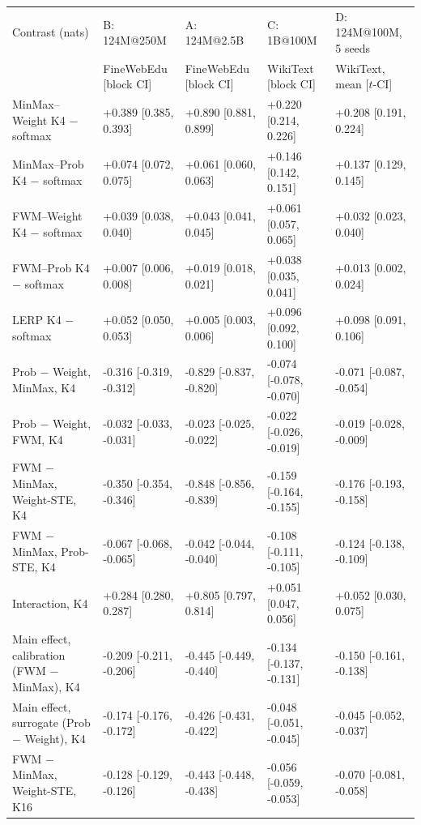 \setlength{\tabcolsep}{3pt}\begin{tabular}{lllll}
\toprule
Contrast (nats) & B: 124M@250M & A: 124M@2.5B & C: 1B@100M & D: 124M@100M, 5 seeds \\
& FineWebEdu [block CI] & FineWebEdu [block CI] & WikiText [block CI] & WikiText, mean [$t$-CI] \\
\midrule
MinMax--Weight K4 $-$ softmax & +0.389 [0.385, 0.393] & +0.890 [0.881, 0.899] & +0.220 [0.214, 0.226] & +0.208 [0.191, 0.224] \\
MinMax--Prob K4 $-$ softmax & +0.074 [0.072, 0.075] & +0.061 [0.060, 0.063] & +0.146 [0.142, 0.151] & +0.137 [0.129, 0.145] \\
FWM--Weight K4 $-$ softmax & +0.039 [0.038, 0.040] & +0.043 [0.041, 0.045] & +0.061 [0.057, 0.065] & +0.032 [0.023, 0.040] \\
FWM--Prob K4 $-$ softmax & +0.007 [0.006, 0.008] & +0.019 [0.018, 0.021] & +0.038 [0.035, 0.041] & +0.013 [0.002, 0.024] \\
LERP K4 $-$ softmax & +0.052 [0.050, 0.053] & +0.005 [0.003, 0.006] & +0.096 [0.092, 0.100] & +0.098 [0.091, 0.106] \\
\midrule Prob $-$ Weight, MinMax, K4 & -0.316 [-0.319, -0.312] & -0.829 [-0.837, -0.820] & -0.074 [-0.078, -0.070] & -0.071 [-0.087, -0.054] \\
Prob $-$ Weight, FWM, K4 & -0.032 [-0.033, -0.031] & -0.023 [-0.025, -0.022] & -0.022 [-0.026, -0.019] & -0.019 [-0.028, -0.009] \\
FWM $-$ MinMax, Weight-STE, K4 & -0.350 [-0.354, -0.346] & -0.848 [-0.856, -0.839] & -0.159 [-0.164, -0.155] & -0.176 [-0.193, -0.158] \\
FWM $-$ MinMax, Prob-STE, K4 & -0.067 [-0.068, -0.065] & -0.042 [-0.044, -0.040] & -0.108 [-0.111, -0.105] & -0.124 [-0.138, -0.109] \\
Interaction, K4 & +0.284 [0.280, 0.287] & +0.805 [0.797, 0.814] & +0.051 [0.047, 0.056] & +0.052 [0.030, 0.075] \\
Main effect, calibration (FWM $-$ MinMax), K4 & -0.209 [-0.211, -0.206] & -0.445 [-0.449, -0.440] & -0.134 [-0.137, -0.131] & -0.150 [-0.161, -0.138] \\
Main effect, surrogate (Prob $-$ Weight), K4 & -0.174 [-0.176, -0.172] & -0.426 [-0.431, -0.422] & -0.048 [-0.051, -0.045] & -0.045 [-0.052, -0.037] \\
\midrule FWM $-$ MinMax, Weight-STE, K16 & -0.128 [-0.129, -0.126] & -0.443 [-0.448, -0.438] & -0.056 [-0.059, -0.053] & -0.070 [-0.081, -0.058] \\

\end{tabular}
